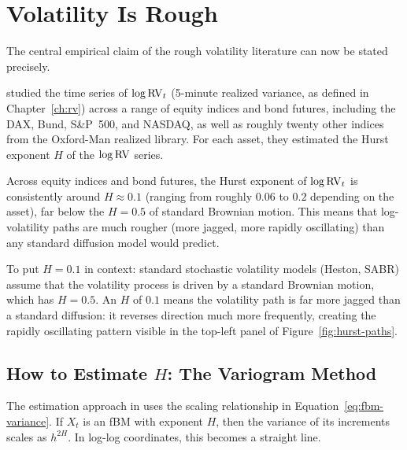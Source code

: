 \section{Volatility Is Rough}
\label{sec:vol-is-rough}

The central empirical claim of the rough volatility literature can now be stated precisely.

\citet{GJR2018} studied the time series of $\log \operatorname{RV}_t$ (5-minute realized variance, as defined in Chapter~\ref{ch:rv}) across a range of equity indices and bond futures, including the DAX, Bund, S\&P~500, and NASDAQ, as well as roughly twenty other indices from the Oxford-Man realized library.
For each asset, they estimated the Hurst exponent $H$ of the $\log \operatorname{RV}$ series.

\begin{keyresult}
Across equity indices and bond futures, the Hurst exponent of $\log \operatorname{RV}_t$ is consistently around $H \approx 0.1$ (ranging from roughly $0.06$ to $0.2$ depending on the asset), far below the $H = 0.5$ of standard Brownian motion.
This means that log-volatility paths are much rougher (more jagged, more rapidly oscillating) than any standard diffusion model would predict.
\end{keyresult}

To put $H = 0.1$ in context: standard stochastic volatility models (Heston, SABR) assume that the volatility process is driven by a standard Brownian motion, which has $H = 0.5$.
An $H$ of $0.1$ means the volatility path is far more jagged than a standard diffusion: it reverses direction much more frequently, creating the rapidly oscillating pattern visible in the top-left panel of Figure~\ref{fig:hurst-paths}.

\subsection{How to Estimate $H$: The Variogram Method}

The estimation approach in \citet{GJR2018} uses the scaling relationship in Equation~\eqref{eq:fbm-variance}.
If $X_t$ is an fBM with exponent $H$, then the variance of its increments scales as $h^{2H}$.
In log-log coordinates, this becomes a straight line.

